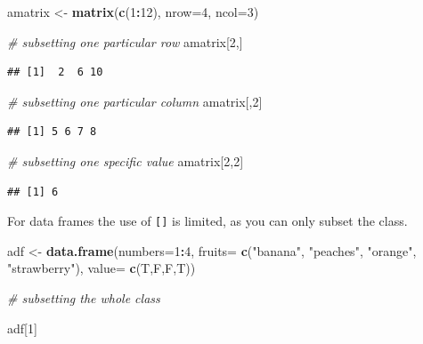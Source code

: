 \documentclass[]{report}
\newenvironment{Shaded}{\begin{snugshade}}{\end{snugshade}}
\newcommand{\KeywordTok}[1]{\textcolor[rgb]{0.13,0.29,0.53}{\textbf{#1}}}
\newcommand{\DataTypeTok}[1]{\textcolor[rgb]{0.13,0.29,0.53}{#1}}
\newcommand{\DecValTok}[1]{\textcolor[rgb]{0.00,0.00,0.81}{#1}}
\newcommand{\StringTok}[1]{\textcolor[rgb]{0.31,0.60,0.02}{#1}}
\newcommand{\CommentTok}[1]{\textcolor[rgb]{0.56,0.35,0.01}{\textit{#1}}}
\newcommand{\OperatorTok}[1]{\textcolor[rgb]{0.81,0.36,0.00}{\textbf{#1}}}
\newcommand{\NormalTok}[1]{#1}
\begin{document}
\begin{Shaded}
\begin{Highlighting}[]
\NormalTok{amatrix <-}\StringTok{ }\KeywordTok{matrix}\NormalTok{(}\KeywordTok{c}\NormalTok{(}\DecValTok{1}\OperatorTok{:}\DecValTok{12}\NormalTok{), }\DataTypeTok{nrow=}\DecValTok{4}\NormalTok{, }\DataTypeTok{ncol=}\DecValTok{3}\NormalTok{) }

\CommentTok{# subsetting one particular row}
\NormalTok{amatrix[}\DecValTok{2}\NormalTok{,]}
\end{Highlighting}
\end{Shaded}

\begin{verbatim}
## [1]  2  6 10
\end{verbatim}

\begin{Shaded}
\begin{Highlighting}[]
\CommentTok{# subsetting one particular column}
\NormalTok{amatrix[,}\DecValTok{2}\NormalTok{]}
\end{Highlighting}
\end{Shaded}

\begin{verbatim}
## [1] 5 6 7 8
\end{verbatim}

\begin{Shaded}
\begin{Highlighting}[]
\CommentTok{# subsetting one specific value}
\NormalTok{amatrix[}\DecValTok{2}\NormalTok{,}\DecValTok{2}\NormalTok{]}
\end{Highlighting}
\end{Shaded}

\begin{verbatim}
## [1] 6
\end{verbatim}

For data frames the use of \texttt{{[}{]}} is limited, as you can only
subset the class.

\begin{Shaded}
\begin{Highlighting}[]
\NormalTok{adf <-}\StringTok{ }\KeywordTok{data.frame}\NormalTok{(}\DataTypeTok{numbers=}\DecValTok{1}\OperatorTok{:}\DecValTok{4}\NormalTok{,}
                  \DataTypeTok{fruits=} \KeywordTok{c}\NormalTok{(}\StringTok{"banana"}\NormalTok{, }\StringTok{"peaches"}\NormalTok{, }\StringTok{"orange"}\NormalTok{, }\StringTok{"strawberry"}\NormalTok{),}
                  \DataTypeTok{value=} \KeywordTok{c}\NormalTok{(T,F,F,T))}

\CommentTok{# subsetting the whole class}

\NormalTok{adf[}\DecValTok{1}\NormalTok{]}
\end{Highlighting}
\end{Shaded}
\end{document}
